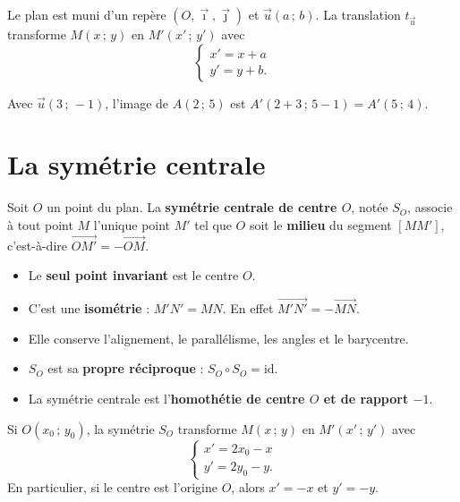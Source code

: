 \begin{propriete}
Le plan est muni d'un repère $(O,\vec{\imath},\vec{\jmath})$ et $\vec u(a\,;\,b)$.
La translation $t_{\vec u}$ transforme $M(x\,;\,y)$ en $M'(x'\,;\,y')$ avec
\[ \begin{cases} x'=x+a\\[2pt] y'=y+b. \end{cases} \]
\end{propriete}

\begin{exemple}
Avec $\vec u(3\,;\,-1)$, l'image de $A(2\,;\,5)$ est $A'(2+3\,;\,5-1)=A'(5\,;\,4)$.
\end{exemple}

\section{La symétrie centrale}

\begin{definition}
Soit $O$ un point du plan. La \textbf{symétrie centrale de centre $O$}, notée $S_O$,
associe à tout point $M$ l'unique point $M'$ tel que $O$ soit le \textbf{milieu} du
segment $[MM']$, c'est-à-dire $\overrightarrow{OM'}=-\overrightarrow{OM}$.
\end{definition}

\begin{propriete}
\begin{itemize}
  \item Le \textbf{seul point invariant} est le centre $O$.
  \item C'est une \textbf{isométrie} : $M'N'=MN$. En effet
        $\overrightarrow{M'N'}=-\overrightarrow{MN}$.
  \item Elle conserve l'alignement, le parallélisme, les angles et le barycentre.
  \item $S_O$ est sa \textbf{propre réciproque} : $S_O\circ S_O=\mathrm{id}$.
  \item La symétrie centrale est l'\textbf{homothétie de centre $O$ et de rapport
        $-1$}.
\end{itemize}
\end{propriete}

\begin{propriete}
Si $O(x_0\,;\,y_0)$, la symétrie $S_O$ transforme $M(x\,;\,y)$ en
$M'(x'\,;\,y')$ avec
\[ \begin{cases} x'=2x_0-x\\[2pt] y'=2y_0-y. \end{cases} \]
En particulier, si le centre est l'origine $O$, alors $x'=-x$ et $y'=-y$.
\end{propriete}

